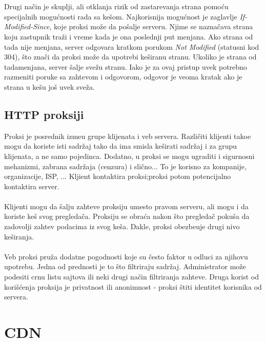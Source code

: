 \documentclass{article} %
\begin{document}
\\
\\ Drugi na\v cin je skuplji, ali otklanja rizik od zastarevanja strana pomo\' cu specijalnih mogu\' cnosti rada sa ke\v som. Najkorisnija mogu\' cnost je zaglavlje \textit{If-Modified-Since}, koje proksi mo\v ze da po\v salje serveru. Njime se nazna\v cava strana koju zastupnik tra\v zi i vreme kada je ona poslednji put menjana. Ako strana od tada nije menjana, server odgovara kratkom porukom \textit{Not Modified} (statusni kod 304), \v sto zna\v ci da proksi mo\v ze da upotrebi ke\v siranu stranu. Ukoliko je strana od tadamenjana, server \v salje sve\v zu stranu. Iako je za ovaj pristup uvek potrebno razmeniti poruke sa zahtevom i odgovorom, odgovor je veoma kratak ako je strana u ke\v su jo\v s uvek sve\v za. 





\subsection{HTTP proksiji}
Proksi je posrednik izme\dj u grupe klijenata i veb servera. Razli\v citi klijenti tako\dj e mogu da koriste isti sadr\v zaj tako da ima smisla ke\v sirati sadr\v zaj i za grupu klijenata, a ne samo pojedinca. Dodatno, u proksi se mogu ugraditi i sigurnosni mehanizmi, zabrana sadr\v zaja (cenzura) i sli\v cno... To je korisno za kompanije, organizacije, ISP, ... Kljient kontaktira proksi;proksi potom potencijalno kontaktira server.
\\
\\ Klijenti mogu da \v salju zahteve proksiju umesto pravom serveru, ali mogu i da koriste ke\v s svog pregleda\v ca. Proksiju se obra\' ca nakon \v sto pregleda\v c poku\v sa da zadovolji zahtev podacima iz svog ke\v sa. Dakle, proksi obezbe\dj uje drugi nivo ke\v siranja.
\\
\\ Veb proksi pru\v za dodatne pogodnosti koje su \v cesto faktor u odluci za njihovu upotrebu. Jedna od prednosti je to \v sto filtriraju sadr\v zaj. Administrator mo\v ze podesiti crnu listu sajtova ili neki drugi na\v cin filtriranja zahteve. Druga korist od kori\v s\' cenja proksija je privatnost ili anonimnost - proksi \v stiti identitet korisnika od servera.


%
%

\section{CDN}
\end{document}
